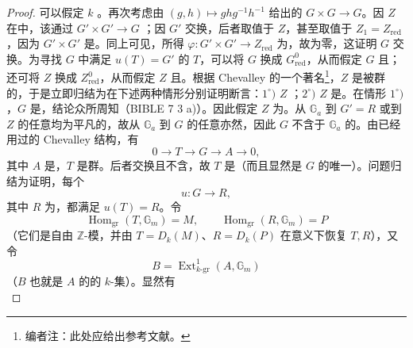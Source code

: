 \begin{proof}
可以假定 $k$ 。再次考虑由 $(g,h)\mapsto ghg^{-1}h^{-1}$ 给出的 $G\times G\to G$。因 $Z$ 在中，该通过 $G'\times G'\to G$ ；因 $G'$ 交换，后者取值于 $Z$，甚至取值于 $Z_1=Z_{\mathrm{red}}$，因为 $G'\times G'$ 是。同上可见，所得 $\varphi:G'\times G'\to Z_{\mathrm{red}}$ 为，故为零，这证明 $G$ 交换。为寻找 $G$ 中满足 $u(T)=G'$ 的 $T$，可以将 $G$ 换成 $G^0_{\mathrm{red}}$，从而假定 $G$ 且；
还可将 $Z$ 换成 $Z^0_{\mathrm{red}}$，从而假定 $Z$ 且。根据 Chevalley 的一个著名\footnote{编者注：此处应给出参考文献。}，$Z$ 是被群的，于是立即归结为在下述两种情形分别证明断言：$1^\circ)$ $Z$ ；$2^\circ)$ $Z$ 是。在情形 $1^\circ)$，$G$ 是，结论众所周知（BIBLE 7  3 a)）。因此假定 $Z$ 为。从 $\mathbb G_a$ 到 $G'=R$ 或到 $Z$ 的任意均为平凡的，故从 $\mathbb G_a$ 到 $G$ 的任意亦然，因此 $G$ 不含于 $\mathbb G_a$ 的。由已经用过的 Chevalley 结构，有
\[
0\longrightarrow T\longrightarrow G\longrightarrow A\longrightarrow0,\tag{*}
\]
其中 $A$ 是，$T$ 是群。后者交换且不含，故 $T$ 是（而且显然是 $G$ 的唯一）。问题归结为证明，每个
\[
u:G\longrightarrow R,
\]
其中 $R$ 为，都满足 $u(T)=R$。令
\[
\operatorname{Hom}_{\mathrm{gr}}(T,\mathbb G_m)=M,\qquad
\operatorname{Hom}_{\mathrm{gr}}(R,\mathbb G_m)=P
\]
（它们是自由 $\mathbb Z$-模，并由 $T=D_k(M)$、$R=D_k(P)$ 在意义下恢复 $T,R$），又令
\[
B=\operatorname{Ext}^1_{k\text{-gr}}(A,\mathbb G_m)
\]
（$B$ 也就是 $A$ 的的 $k$-集）。显然有
\[
\]
\end{proof}
